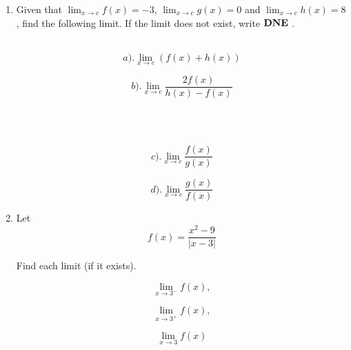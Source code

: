 \documentclass{exam}
\begin{document}
\begin{enumerate}
\item
Given that $\lim_{x\to c} f(x)=-3$, $\lim_{x\to c} g(x)=0$ and $\lim_{x\to c} h(x)=8$, find the following limit. If the limit does not exist, write $\bf{DNE}$ . 
\\
\\
\begin{minipage}{.5\linewidth}
\begin{equation*}
a).  \lim_{x\to c} (f(x)+h(x))
\end{equation*}
\end{minipage}%
\begin{minipage}{.5\linewidth}
\begin{equation*}
b).  \lim_{x\to c} \frac{2f(x)}{h(x)-f(x)}
\end{equation*}
\end{minipage}
\\
\\
\begin{minipage}{.5\linewidth}
\begin{equation*}
c).  \lim_{x\to c} \frac{f(x)}{g(x)}
\end{equation*}
\end{minipage}%
\begin{minipage}{.5\linewidth}
\begin{equation*}
d).  \lim_{x\to c} \frac{g(x)}{f(x)}
\end{equation*}
\end{minipage}
\vfill








\item
Let 
\[
f(x)=\frac{x^{2}-9}{|x-3|}
\]

Find each limit (if it exists).

\begin{minipage}{.3\linewidth}
\begin{equation*}
 \lim_{x\to 3^{-}}f(x),
\end{equation*}
\end{minipage}%
\begin{minipage}{.3\linewidth}
\begin{equation*}
 \lim_{x\to 3^{+}}f(x),
\end{equation*}
\end{minipage}%
\begin{minipage}{.3\linewidth}
\begin{equation*}
 \lim_{x\to 3}f(x)
\end{equation*}
\end{minipage}


\end{enumerate}
\end{document}
